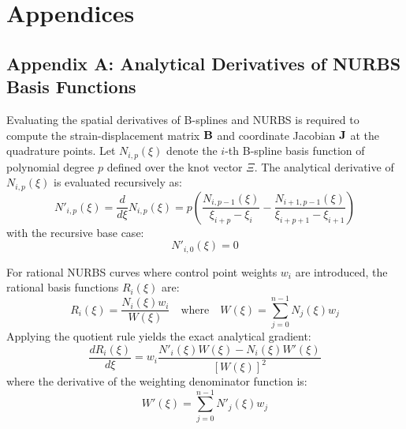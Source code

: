 \chapter*{Appendices}

\section*{Appendix A: Analytical Derivatives of NURBS Basis Functions}
Evaluating the spatial derivatives of B-splines and NURBS is required to compute the strain-displacement matrix $\mathbf{B}$ and coordinate Jacobian $\mathbf{J}$ at the quadrature points. Let $N_{i,p}(\xi)$ denote the $i$-th B-spline basis function of polynomial degree $p$ defined over the knot vector $\Xi$. The analytical derivative of $N_{i,p}(\xi)$ is evaluated recursively as:
\begin{equation}
    N'_{i,p}(\xi) = \frac{d}{d\xi} N_{i,p}(\xi) = p \left( \frac{N_{i,p-1}(\xi)}{\xi_{i+p} - \xi_i} - \frac{N_{i+1,p-1}(\xi)}{\xi_{i+p+1} - \xi_{i+1}} \right)
\end{equation}
with the recursive base case:
\begin{equation}
    N'_{i,0}(\xi) = 0
\end{equation}

For rational NURBS curves where control point weights $w_i$ are introduced, the rational basis functions $R_i(\xi)$ are:
\begin{equation}
    R_i(\xi) = \frac{N_i(\xi) w_i}{W(\xi)} \quad \text{where} \quad W(\xi) = \sum_{j=0}^{n-1} N_j(\xi) w_j
\end{equation}
Applying the quotient rule yields the exact analytical gradient:
\begin{equation}
    \frac{d R_i(\xi)}{d\xi} = w_i \frac{N'_i(\xi) W(\xi) - N_i(\xi) W'(\xi)}{[W(\xi)]^2}
\end{equation}
where the derivative of the weighting denominator function is:
\begin{equation}
    W'(\xi) = \sum_{j=0}^{n-1} N'_j(\xi) w_j
\end{equation}

